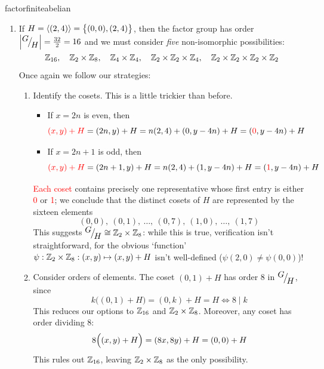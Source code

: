 \begin{examples}{}{factorfiniteabelian}
\begin{enumerate}
		\goodbreak
	
		\item\label{ex:factoriso3} If $H=\left\langle (2,4)\right\rangle=\bigl\{(0,0),(2,4)\bigr\}$, then the factor group has order $\smash[b]{\left| {}^{\textstyle {G}}\!\big/_{\textstyle \!{H}}\right|}=\frac{32}2=16$ and we must consider \emph{five} non-isomorphic possibilities:\footnotemark{}
		\[
			\mathbb{Z}_{16},\quad \mathbb{Z}_2\times\mathbb{Z}_8,\quad \mathbb{Z}_4\times\mathbb{Z}_4,\quad \mathbb{Z}_2\times\mathbb{Z}_2\times\mathbb{Z}_4,\quad \mathbb{Z}_2\times\mathbb{Z}_2\times\mathbb{Z}_2\times\mathbb{Z}_2
		\]
		Once again we follow our strategies:
		\begin{enumerate}
		  \item Identify the cosets. This is a little trickier than before.
		  \begin{itemize}
	  		\item If $x=2n$ is even, then
	  		\[
	  			\textcolor{red}{(x,y)+H}
	  			=(2n,y)+H
	  			=n(2,4)+(0,y-4n)+H
	  			=(\textcolor{red}{0},y-4n)+H
	  		\]
	  		\item If $x=2n+1$ is odd, then
	  		\[
	  			\textcolor{red}{(x,y)+H}
	  			=(2n+1,y)+H
	  			=n(2,4)+(1,y-4n)+H
	  			=(\textcolor{red}{1},y-4n)+H
	  		\]
	  	\end{itemize}
	 		\textcolor{red}{Each coset} contains precisely one representative whose first entry is either \textcolor{red}{0} or \textcolor{red}{1}; we conclude that the distinct cosets of $H$ are represented by the sixteen elements
			\[
				(0,0),\ (0,1),\ \ldots,\ (0,7),\ (1,0),\ \ldots,\ (1,7) \tag{$(x,y)$ where $x\in\Z_2$, $y\in\Z_8$}
			\]
			This suggests ${}^{\textstyle {G}}\!\big/_{\textstyle \!{H}}\cong\mathbb{Z}_2\times\mathbb{Z}_8$: while this is true, verification isn't straightforward, for the obvious `function' $\psi:\mathbb{Z}_2\times\mathbb{Z}_8:(x,y)\mapsto(x,y)+H$ isn't well-defined ($\psi(2,0)\neq\psi(0,0)$)!
		  
			\item Consider orders of elements. The coset $(0,1)+H$ has order 8 in ${}^{\textstyle {G}}\!\big/_{\textstyle \!{H}}$, since
			\[
				k\bigl((0,1)+H\bigr)=(0,k)+H=H\iff 8\mid k
			\]
			This reduces our options to $\mathbb{Z}_{16}$ and $\mathbb{Z}_2\times\mathbb{Z}_8$. Moreover, any coset has order dividing 8:
			\[
				8\Bigl((x,y)+H\Bigr)
				=(8x,8y)+H
				=(0,0)+H
			\]
	  	This rules out $\mathbb{Z}_{16}$, leaving $\mathbb{Z}_2\times\mathbb{Z}_8$ as the only possibility.
		\end{enumerate}
	\end{enumerate}
\end{examples}


		
